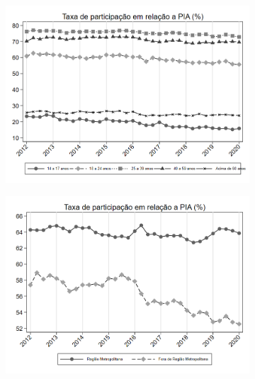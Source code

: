 \documentclass[11pt]{beamer}
\begin{document}
\begin{frame}
\begin{figure}[h!tpb]
\begin{subfigure}{.5\textwidth}
  \centering
  \includegraphics[width=.95\linewidth]{../../analysis/output/composicao_demografica/faixa_etaria/_composicao_demografica_faixa_etaria_taxa_de_participacao.png}
  \label{fig:_composicao_demografica_faixa_etaria_taxa_de_participacao}
\end{subfigure}%
\begin{subfigure}{.5\textwidth}
  \centering
  \includegraphics[width=.95\linewidth]{../../analysis/output/composicao_demografica/area_geografica/_composicao_demografica_regiao_metro_taxa_de_participacao.png}
  \label{fig:_composicao_demografica_regiao_metro_taxa_de_participacao}
\end{subfigure}

\label{fig:composicao_demografica}
\end{figure}
\end{frame}
\end{document}
